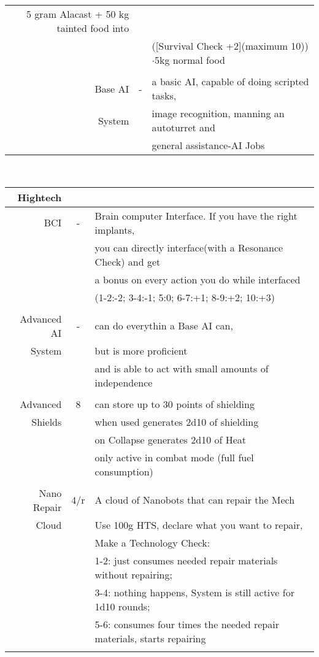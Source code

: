\documentclass{article}
\begin{document}
\begin{tabular}{rcl}
             5 gram Alacast + 50 kg tainted food into \\&& ([Survival Check +2](maximum 10))\(\cdot\)5kg normal food\\\\
Base AI & - & a basic AI, capable of doing scripted tasks,\\
System & & image recognition, manning an autoturret and \\&& general assistance-AI Jobs \\
\end{tabular}\\\begin{tabular}{rcl}\\Hightech\\\hline
BCI & - & Brain computer Interface. If you have the right implants,\\&&
            you can directly interface(with a Resonance Check) and get \\&&
            a bonus on every action you do while interfaced \\&& (1-2:-2; 3-4:-1; 5:0; 6-7:+1; 8-9:+2; 10:+3)\\\\
Advanced AI & - & can do everythin a Base AI can,\\
System & & but is more proficient  \\&& and is able to act with small amounts of independence \\\\
Advanced & 8 & can store up to 30 points of shielding\\
Shields && when used generates 2d10 of shielding
            \\&&on Collapse generates 2d10 of Heat\\&&only active in combat mode (full fuel consumption)\\\\
Nano Repair & 4/r & A cloud of Nanobots that can repair the Mech \\
Cloud           && Use 100g HTS, declare what you want to repair,\\&&
                   Make a Technology Check: \\&& 1-2: just consumes needed repair materials without repairing;\\&&
                    3-4: nothing happens, System is still active for 1d10 rounds; \\&&
                    5-6: consumes four times the needed repair materials, starts repairing\\&&

\end{tabular}
\end{document}
